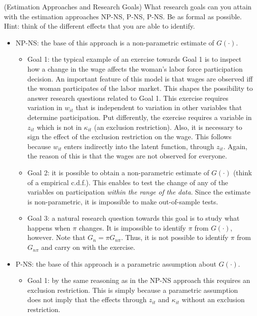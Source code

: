 \begin{exercise} (Estimation Approaches and Research Goals) \label{exercise:approaches}
What research goals can you attain with the estimation approaches NP-NS, P-NS, P-NS. Be as formal as possible. Hint: think of the different effects that you are able to identify.
\begin{itemize}
\item NP-NS: the base of this approach is a non-parametric estimate of $G(\cdot)$.
\begin{itemize}
\item Goal 1: the typical example of an exercise towards Goal 1 is to inspect how a change in the wage affects the woman's labor force participation decision. An important feature of this model is that wages are observed iff the woman participates of the labor market. This shapes the possibility to answer research questions related to Goal 1. This exercise requires variation in $w_{it}$ that is independent to variation in other variables that determine participation. Put differently, the exercise requires a variable in $z_{it}$ which is not in $\kappa_{it}$ (an exclusion restriction). Also, it is necessary to sign the effect of the exclusion restriction on the wage. This follows because $w_{it}$ enters indirectly into the latent function, through $z_{it}$. Again, the reason of this is that the wages are not observed for everyone.   
\item Goal 2: it is possible to obtain a non-parametric estimate of $G(\cdot)$ (think of a empirical c.d.f.). This enables to test the change of any of the variables on participation \emph{within the range of the data}. Since the estimate is non-parametric, it is impossible to make out-of-sample tests.   
\item Goal 3: a natural research question towards this goal is to study what happens when $\pi$ changes. It is impossible to identify $\pi$ from $G(\cdot)$, however. Note that $G_{n} = \pi G_{n \pi}$. Thus, it is not possible to identify $\pi$ from $G_{n \pi}$ and carry on with the exercise.
\end{itemize} 
\item P-NS: the base of this approach is a parametric assumption about $G(\cdot)$.
\begin{itemize}
\item Goal 1: by the same reasoning as in the NP-NS approach this requires an exclusion restriction. This is simply because a parametric assumption does not imply that the effects through $z_{it}$ and $\kappa_{it}$ without an exclusion restriction. 

\end{itemize}
\end{itemize}
\end{exercise}
